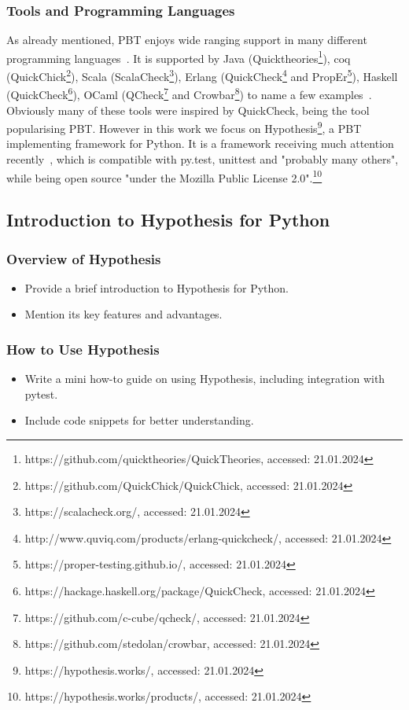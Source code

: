 \documentclass[runningheads]{llncs}
\begin{document}
\subsubsection{Tools and Programming Languages}
As already mentioned, PBT enjoys wide ranging support in many different programming languages~\cite{Chen2022,Shi2023}. It is supported by Java (Quicktheories\footnote{https://github.com/quicktheories/QuickTheories, accessed: 21.01.2024}), coq (QuickChick\footnote{https://github.com/QuickChick/QuickChick, accessed: 21.01.2024}), Scala (ScalaCheck\footnote{https://scalacheck.org/, accessed: 21.01.2024}), Erlang (QuickCheck\footnote{http://www.quviq.com/products/erlang-quickcheck/, accessed: 21.01.2024} and PropEr\footnote{https://proper-testing.github.io/, accessed: 21.01.2024}), Haskell (QuickCheck\footnote{https://hackage.haskell.org/package/QuickCheck, accessed: 21.01.2024}), OCaml (QCheck\footnote{https://github.com/c-cube/qcheck/, accessed: 21.01.2024} and Crowbar\footnote{https://github.com/stedolan/crowbar, accessed: 21.01.2024}) to name a few examples~\cite{MacIver2016,Padhye2019,Paraskevopoulou2015,Arts2008,Papadakis2011,Claessen2000}. Obviously many of these tools were inspired by QuickCheck, being the tool popularising PBT. However in this work we focus on Hypothesis\footnote{https://hypothesis.works/, accessed: 21.01.2024}, a PBT implementing framework for Python. It is a framework receiving much attention recently~\cite{Corgozinho2023,MacIver2019}, which is compatible with py.test, unittest and "probably many others", while being open source "under the Mozilla Public License 2.0".\footnote{https://hypothesis.works/products/, accessed: 21.01.2024}

\subsection{Introduction to Hypothesis for Python}
\subsubsection{Overview of Hypothesis}
\begin{itemize}
  \item Provide a brief introduction to Hypothesis for Python.
  \item Mention its key features and advantages.
\end{itemize}

\subsubsection{How to Use Hypothesis}
\begin{itemize}
  \item Write a mini how-to guide on using Hypothesis, including integration with pytest.
  \item Include code snippets for better understanding.
\end{itemize}
\end{document}
